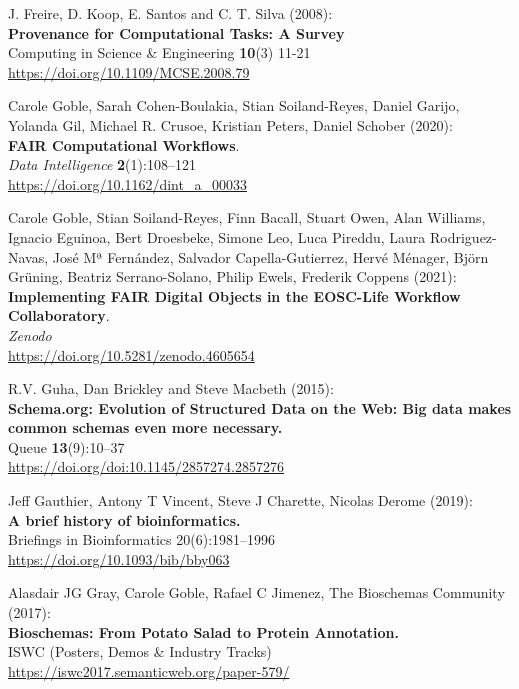 \documentclass[10pt,letterpaper]{article}
\begin{document}
\begin{thebibliography}{10}
 J. Freire, D. Koop, E. Santos and C. T. Silva
(2008):\\
\textbf{Provenance for Computational Tasks: A Survey}\\
Computing in Science \& Engineering \textbf{10}(3) 11-21\\
\url{https://doi.org/10.1109/MCSE.2008.79}

 Carole Goble, Sarah Cohen-Boulakia, Stian
Soiland-Reyes, Daniel Garijo, Yolanda Gil, Michael R. Crusoe, Kristian
Peters, Daniel Schober (2020):\\
\textbf{FAIR Computational Workflows}.\\
\emph{Data Intelligence} \textbf{2}(1):108--121\\
\url{https://doi.org/10.1162/dint_a_00033}

 Carole Goble, Stian Soiland-Reyes, Finn Bacall, Stuart
Owen, Alan Williams, Ignacio Eguinoa, Bert Droesbeke, Simone Leo, Luca
Pireddu, Laura Rodriguez-Navas, José Mª Fernández, Salvador
Capella-Gutierrez, Hervé Ménager, Björn Grüning, Beatriz Serrano-Solano,
Philip Ewels, Frederik Coppens (2021):\\
\textbf{Implementing FAIR Digital Objects in the EOSC-Life Workflow
Collaboratory}.\\
\emph{Zenodo\\
}\url{https://doi.org/10.5281/zenodo.4605654}

 R.V. Guha, Dan Brickley and Steve Macbeth (2015):\\
\textbf{Schema.org: Evolution of Structured Data on the Web: Big data
makes common schemas even more necessary.}\\
Queue \textbf{13}(9):10--37\\
\url{https://doi.org/doi:10.1145/2857274.2857276}

 Jeff Gauthier, Antony T Vincent, Steve J Charette,
Nicolas Derome (2019):\\
\textbf{A brief history of bioinformatics.}\\
Briefings in Bioinformatics 20(6):1981--1996\\
\url{https://doi.org/10.1093/bib/bby063}

 Alasdair JG Gray, Carole Goble, Rafael C Jimenez, The
Bioschemas Community (2017):\\
\textbf{Bioschemas: From Potato Salad to Protein Annotation.}\\
ISWC (Posters, Demos \& Industry Tracks)\\
\url{https://iswc2017.semanticweb.org/paper-579/}


\end{thebibliography}
\end{document}
